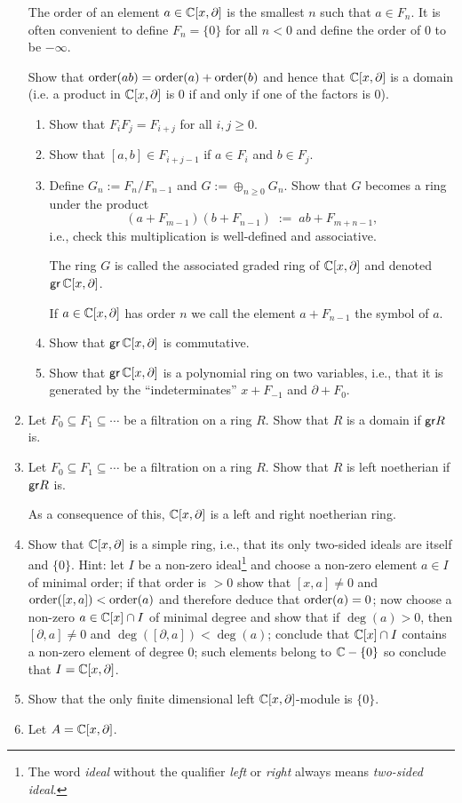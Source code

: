 \documentclass[12pt]{article}
\newcommand{\CC}{\bbC}
\begin{document}
\begin{enumerate}
The {\sf order} of an element $a \in \mathbb{C}[x,\partial]$ is the smallest $n$ such that $a \in F_n$. It is often convenient to define $F_n=\{0\}$ for
all $n<0$ and define the order of 0 to be $-\infty$.

Show that ${\rm order}(ab)={\rm order}(a) + {\rm order}(b)$ and hence that $\mathbb{C}[x,\partial]$ is a domain (i.e. a product in
$\mathbb{C}[x,\partial]$ is 0 if and only if one of the factors is 0).
\begin{enumerate}
  \item
  Show that $F_iF_j=F_{i+j}$ for all $i,j \ge 0$.  
  \item 
  Show that $[a,b] \in F_{i+j-1}$ if $a \in F_i$ and $b \in F_j$.
  \item 
  Define $G_n:=F_n/F_{n-1}$ and $G:= \oplus_{n \ge 0} G_n$. Show that $G$ becomes a ring under the product
  $$
  (a+F_{m-1})(b+F_{n-1}) \; :=\; ab+F_{m+n-1},
  $$
  i.e., check this multiplication is well-defined and associative.
  
The ring $G$ is called {\sf the associated graded ring} of $\mathbb{C}[x,\partial]$ and denoted ${\sf gr}\, \mathbb{C}[x,\partial]$.
  
  If $a \in \mathbb{C}[x,\partial]$ has order $n$ we call the element $a+F_{n-1}$ the {\sf symbol} of $a$.
  \item
  Show that ${\sf gr}\, \mathbb{C}[x,\partial]$ is commutative.
  \item
   Show that ${\sf gr} \, \mathbb{C}[x,\partial]$ is a polynomial ring on two variables, i.e., that it is generated by the ``indeterminates''
   $x+F_{-1}$ and $\partial+F_0$. 
\end{enumerate}
\item
Let $F_0 \subseteq F_1 \subseteq \cdots$ be a filtration on a ring $R$. Show that $R$ is a domain if ${\sf gr} R$ is.
\item
Let $F_0 \subseteq F_1 \subseteq \cdots$ be a filtration on a ring $R$. Show that $R$ is left noetherian if ${\sf gr} R$ is.

As a consequence of this, $\mathbb{C}[x,\partial]$ is a left and right noetherian ring.
\item
Show that $\mathbb{C}[x,\partial]$ is a simple ring, i.e., that its only two-sided ideals are itself and $\{0\}$. Hint: let $I$ be a non-zero ideal\footnote{The word {\it ideal} without the qualifier {\it left} or {\it right} always means {\it two-sided ideal}. } and choose a
non-zero element $a \in I$ of minimal order; if that order is $>0$ show that $[x,a] \ne 0$ and ${\rm order}([x,a])<{\rm order}(a)$
and therefore deduce that ${\rm order}(a)=0$; 
now choose a non-zero $a \in \mathbb{C}[x] \cap I$ of minimal degree and show that if $\deg(a)>0$, then $[\partial,a]\ne 0$ and
$\deg([\partial,a])<\deg(a)$; conclude that $\mathbb{C}[x] \cap I$ contains a non-zero element of degree 0; such elements belong to $\CC-\{0\}$ 
so conclude that $I=\mathbb{C}[x,\partial]$.
\item
Show that the only finite dimensional left $\mathbb{C}[x,\partial]$-module is $\{0\}$. 
\item
\label{ex.simple.module}
Let $A=\mathbb{C}[x,\partial]$.


\end{enumerate}
\end{document}
